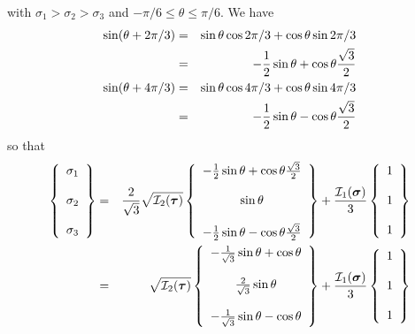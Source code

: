 with $\sigma_1>\sigma_2>\sigma_3$ and $-\pi/6 \leq \theta \leq \pi/6$. 
We have
\begin{eqnarray}
\sin (\theta + 2\pi/3)  
&=& \sin \theta \cos 2\pi/3 + \cos \theta \sin 2\pi/3 \nonumber\\
&=& -\frac{1}{2}\sin \theta  + \cos \theta \frac{\sqrt{3}}{2} \\
\sin (\theta + 4\pi/3)  
&=& \sin \theta \cos 4\pi/3 + \cos \theta \sin 4\pi/3  \nonumber\\
&=& -\frac{1}{2} \sin \theta - \cos \theta \frac{\sqrt{3}}{2} 
\end{eqnarray}
so that 
\begin{eqnarray}
\left\{
\begin{array}{c}
\sigma_1 \\ \\
\sigma_2 \\ \\
\sigma_3
\end{array}
\right\}
&=& \frac{2  }{\sqrt{3}}\sqrt{ {\cal I}_2({\bm \tau}) }
\left\{
\begin{array}{c}
-\frac{1}{2}\sin \theta  + \cos \theta \frac{\sqrt{3}}{2} \\ \\
\sin \theta   \\ \\
-\frac{1}{2} \sin \theta - \cos \theta \frac{\sqrt{3}}{2} 
\end{array}
\right\}
+
\frac{{\cal I}_1({\bm \sigma})}{3}
\left\{
\begin{array}{c}
1 \\ \\
1 \\ \\
1
\end{array}
\right\} \\
&=& \sqrt{ {\cal I}_2({\bm \tau}) }
\left\{
\begin{array}{c}
-\frac{1}{\sqrt{3}}\sin \theta  + \cos \theta \\ \\
\frac{2}{\sqrt{3}} \sin \theta \\ \\
-\frac{1}{\sqrt{3}}\sin \theta  - \cos \theta 
\end{array}
\right\}
+
\frac{{\cal I}_1({\bm \sigma})}{3}
\left\{
\begin{array}{c}
1 \\ \\
1 \\ \\
1
\end{array}
\right\}
\label{eq:sig123}
\end{eqnarray}






